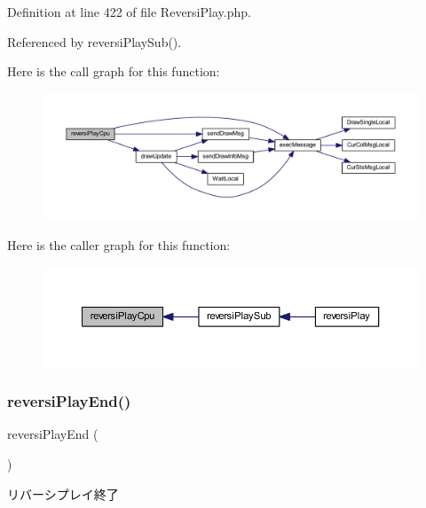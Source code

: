 Definition at line 422 of file Reversi\+Play.\+php.



Referenced by reversi\+Play\+Sub().

Here is the call graph for this function\+:
\nopagebreak
\begin{figure}[H]
\begin{center}
\leavevmode
\includegraphics[width=350pt]{class_reversi_play_a6514ad9244af720ee1ec1777c11e80fb_cgraph}
\end{center}
\end{figure}
Here is the caller graph for this function\+:
\nopagebreak
\begin{figure}[H]
\begin{center}
\leavevmode
\includegraphics[width=350pt]{class_reversi_play_a6514ad9244af720ee1ec1777c11e80fb_icgraph}
\end{center}
\end{figure}
\mbox{\label{class_reversi_play_af55fe6b6f2005c7da80c696ed692783d}} 
\subsubsection{\texorpdfstring{reversi\+Play\+End()}{reversiPlayEnd()}}
{\footnotesize\ttfamily reversi\+Play\+End (\begin{DoxyParamCaption}{ }\end{DoxyParamCaption})}



リバーシプレイ終了 

